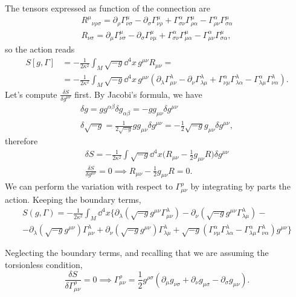 \documentclass[a4paper,12pt]{book}
\begin{document}
The tensors expressed as function of the connection are
\begin{gather*}
R^\mu{}_{\nu\rho\sigma}=\partial_\rho\Gamma^\mu_{\nu\sigma}-\partial_\sigma\Gamma^\mu_{\nu\rho}+\Gamma^\alpha_{\sigma\nu}\Gamma^\mu_{\rho\alpha}-\Gamma^\alpha_{\rho\nu}\Gamma^\mu_{\sigma\alpha}\\
R_{\nu\sigma}=\partial_\mu\Gamma^\mu_{\nu\sigma}-\partial_\sigma\Gamma^\mu_{\nu\mu}+\Gamma^\alpha_{\sigma\nu}\Gamma^\mu_{\mu\alpha}-\Gamma^\alpha_{\mu\nu}\Gamma^\mu_{\sigma\alpha},
\end{gather*}
so the action reads
\begin{align*}
S[g,\Gamma]&=-\frac1{2\kappa^2}\int_M\sqrt{-g}\dd^4x\,g^{\mu\nu}R_{\mu\nu}=\\
&=-\frac1{2\kappa^2}\int_M\sqrt{-g}\dd^4x\,g^{\mu\nu}(\partial_\lambda\Gamma^\lambda_{\mu\nu}-\partial_\nu\Gamma^\lambda_{\lambda\mu}+\Gamma^\alpha_{\nu\mu}\Gamma^\lambda_{\lambda\alpha}-\Gamma^\alpha_{\lambda\mu}\Gamma^\lambda_{\nu\alpha}).
\end{align*}
Let's compute $\frac{\delta S}{\delta g^{\mu\nu}}$ first. By Jacobi's formula, we have
\begin{gather*}
\delta g=gg^{\alpha\beta}\delta g_{\alpha\beta}=-gg_{\mu\nu}\delta g^{\mu\nu}\\
\delta\sqrt{-g}=\frac1{2\sqrt{-g}}gg_{\mu\nu}\delta g^{\mu\nu}=-\frac12\sqrt{-g}g_{\mu\nu}\delta g^{\mu\nu},
\end{gather*}
therefore
\begin{gather*}
\delta S=-\frac1{2\kappa^2}\int\sqrt{-g}\dd^4x\biggl(R_{\mu\nu}-\frac12g_{\mu\nu}R\biggr)\delta g^{\mu\nu}\\
\frac{\delta S}{\delta g^{\mu\nu}}=0\implies R_{\mu\nu}-\frac12g_{\mu\nu}R=0.
\end{gather*}
We can perform the variation with respect to $\Gamma^\rho_{\mu\nu}$ by integrating by parts the action. Keeping the boundary terms,
\begin{multline*}
S(g,\Gamma)=-\frac1{2\kappa^2}\int_M\dd^4x\bigl\{\partial_\lambda(\sqrt{-g}g^{\mu\nu}\Gamma^\lambda_{\mu\nu})-\partial_\nu(\sqrt{-g}g^{\mu\nu}\Gamma^\lambda_{\lambda\mu})-{}\\
-\partial_\lambda(\sqrt{-g}g^{\mu\nu})\Gamma^\lambda_{\mu\nu}+\partial_\nu(\sqrt{-g}g^{\mu\nu})\Gamma^\lambda_{\lambda\mu}+\sqrt{-g}(\Gamma^\alpha_{\nu\mu}\Gamma^\lambda_{\lambda\alpha}-\Gamma^\alpha_{\lambda\mu}\Gamma^\lambda_{\nu\alpha})g^{\mu\nu}\bigr\}
\end{multline*}
\begin{exercise}
\label{thm:varGamma}
Neglecting the boundary terms, and recalling that we are assuming the torsionless condition,
\[\frac{\delta S}{\delta\Gamma^\rho_{\mu\nu}}=0\implies\Gamma^\rho_{\mu\nu}=\frac12g^{\rho\sigma}(\partial_\mu g_{\nu\sigma}+\partial_\nu g_{\mu\sigma}-\partial_\sigma g_{\mu\nu}).\]
\end{exercise}
\end{document}
